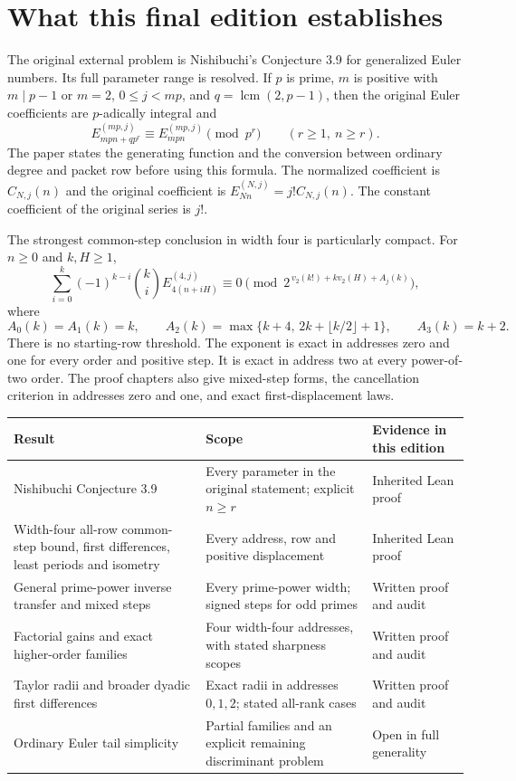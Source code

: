 \section*{What this final edition establishes}
The original external problem is Nishibuchi's Conjecture 3.9 for generalized Euler numbers. Its full parameter range is resolved. If $p$ is prime, $m$ is positive with $m\mid p-1$ or $m=2$, $0\le j<mp$, and $q=\operatorname{lcm}(2,p-1)$, then the original Euler coefficients are $p$-adically integral and
\[
 E_{mpn+qp^r}^{(mp,j)}\equiv E_{mpn}^{(mp,j)}\pmod{p^r}
 \qquad (r\ge1,\ n\ge r).
\]
The paper states the generating function and the conversion between ordinary degree and packet row before using this formula. The normalized coefficient is $C_{N,j}(n)$ and the original coefficient is $E_{Nn}^{(N,j)}=j!C_{N,j}(n)$. The constant coefficient of the original series is $j!$.

The strongest common-step conclusion in width four is particularly compact. For $n\ge0$ and $k,H\ge1$,
\begin{equation*}
 \sum_{i=0}^k(-1)^{k-i}\binom ki E_{4(n+iH)}^{(4,j)}
 \equiv0\pmod{2^{\,v_2(k!)+kv_2(H)+A_j(k)}},
\end{equation*}
where
\[
 A_0(k)=A_1(k)=k,\qquad
 A_2(k)=\max\{k+4,\,2k+\lfloor k/2\rfloor+1\},\qquad
 A_3(k)=k+2.
\]
There is no starting-row threshold. The exponent is exact in addresses zero and one for every order and positive step. It is exact in address two at every power-of-two order. The proof chapters also give mixed-step forms, the cancellation criterion in addresses zero and one, and exact first-displacement laws.

\begin{center}
\small
\begin{tabularx}{\linewidth}{@{}>{\raggedright\arraybackslash}p{.29\linewidth}>{\raggedright\arraybackslash}X>{\raggedright\arraybackslash}p{.21\linewidth}@{}}
\toprule
Result & Scope & Evidence in this edition\\
\midrule
Nishibuchi Conjecture 3.9 & Every parameter in the original statement; explicit $n\ge r$ & Inherited Lean proof\\
Width-four all-row common-step bound, first differences, least periods and isometry & Every address, row and positive displacement & Inherited Lean proof\\
General prime-power inverse transfer and mixed steps & Every prime-power width; signed steps for odd primes & Written proof and audit\\
Factorial gains and exact higher-order families & Four width-four addresses, with stated sharpness scopes & Written proof and audit\\
Taylor radii and broader dyadic first differences & Exact radii in addresses $0,1,2$; stated all-rank cases & Written proof and audit\\
Ordinary Euler tail simplicity & Partial families and an explicit remaining discriminant problem & Open in full generality\\
\bottomrule
\end{tabularx}
\end{center}

